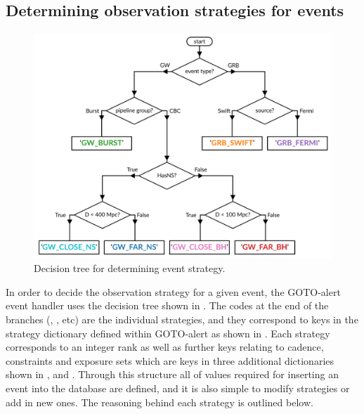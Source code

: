 \subsection{Determining observation strategies for events}
\label{sec:event_strategy}
\begin{colsection}


\begin{figure}[t]
    \begin{center}
        \includegraphics[width=\linewidth]{images/strategy_flowchart.pdf}
    \end{center}
    \caption[Decision tree for determining event strategy]{
        Decision tree for determining event strategy.
    }\label{fig:strategy_flowchart}
\end{figure}

In order to decide the observation strategy for a given event, the GOTO-alert event handler uses the decision tree shown in . The codes at the end of the branches (, , etc) are the individual strategies, and they correspond to keys in the strategy dictionary defined within GOTO-alert as shown in . Each strategy corresponds to an integer rank as well as further keys relating to cadence, constraints and exposure sets which are keys in three additional dictionaries shown in ,  and .  Through this structure all of values required for inserting an event into the database are defined, and it is also simple to modify strategies or add in new ones. The reasoning behind each strategy is outlined below.


\end{colsection}
